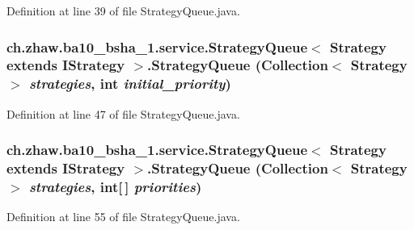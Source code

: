 Definition at line 39 of file StrategyQueue.java.\hypertarget{classch_1_1zhaw_1_1ba10__bsha__1_1_1service_1_1StrategyQueue_3_01Strategy_01extends_01IStrategy_01_4_acf78600218c28b5e92fcfd2ebb18316f}{
\subsubsection[{StrategyQueue}]{\setlength{\rightskip}{0pt plus 5cm}ch.zhaw.ba10\_\-bsha\_\-1.service.StrategyQueue$<$ Strategy extends {\bf IStrategy} $>$.StrategyQueue (Collection$<$ Strategy $>$ {\em strategies}, \/  int {\em initial\_\-priority})}}
\label{classch_1_1zhaw_1_1ba10__bsha__1_1_1service_1_1StrategyQueue_3_01Strategy_01extends_01IStrategy_01_4_acf78600218c28b5e92fcfd2ebb18316f}


Definition at line 47 of file StrategyQueue.java.\hypertarget{classch_1_1zhaw_1_1ba10__bsha__1_1_1service_1_1StrategyQueue_3_01Strategy_01extends_01IStrategy_01_4_ae22c1c70cd9cfa4d5d5d7c62398b76a7}{
\subsubsection[{StrategyQueue}]{\setlength{\rightskip}{0pt plus 5cm}ch.zhaw.ba10\_\-bsha\_\-1.service.StrategyQueue$<$ Strategy extends {\bf IStrategy} $>$.StrategyQueue (Collection$<$ Strategy $>$ {\em strategies}, \/  int\mbox{[}$\,$\mbox{]} {\em priorities})}}
\label{classch_1_1zhaw_1_1ba10__bsha__1_1_1service_1_1StrategyQueue_3_01Strategy_01extends_01IStrategy_01_4_ae22c1c70cd9cfa4d5d5d7c62398b76a7}


Definition at line 55 of file StrategyQueue.java.

